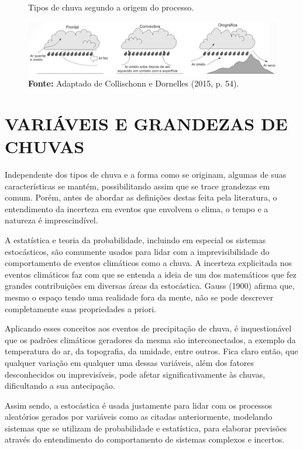 \begin{figure}[!ht]
	\centering
	\caption{Tipos de chuva segundo a origem do processo.}
	\includegraphics[width=.9\linewidth]{figuras/tipos_de_chuva_segundo_a_origem_do_processo.png}
	\caption*{\textbf{Fonte:} Adaptado de Collischonn e Dornelles (2015, p. 54).}
	\label{fig:tipos_de_chuva_segundo_a_origem_do_processo.png}
\end{figure}

\section{VARIÁVEIS E GRANDEZAS DE CHUVAS}

Independente dos tipos de chuva e a forma como se originam, algumas de suas características se mantém, possibilitando assim que se trace grandezas em comum. Porém, antes de abordar as definições destas feita pela literatura, o entendimento da incerteza em eventos que envolvem o clima, o tempo e a natureza é imprescindível.

A estatística e teoria da probabilidade, incluindo em especial os sistemas estocásticos, são comumente usados para lidar com a imprevisibilidade do comportamento de eventos climáticos como a chuva. A incerteza explicitada nos eventos climáticos faz com que se entenda a ideia de um dos matemáticos que fez grandes contribuições em diversas áreas da estocástica. Gauss (1900) afirma que, mesmo o espaço tendo uma realidade fora da mente, não se pode descrever completamente suas propriedades a priori.

Aplicando esses conceitos aos eventos de precipitação de chuva, é inquestionável que os padrões climáticos geradores da mesma são interconectados, a exemplo da temperatura do ar, da topografia, da umidade, entre outros. Fica claro então, que qualquer variação em qualquer uma dessas variáveis, além dos fatores desconhecidos ou imprevisíveis, pode afetar significativamente às chuvas, dificultando a sua antecipação. 

Assim sendo, a estocástica é usada justamente para lidar com os processos aleatórios gerados por variáveis como as citadas anteriormente, modelando sistemas que se utilizam de probabilidade e estatística, para elaborar previsões através do entendimento do comportamento de sistemas complexos e incertos.

